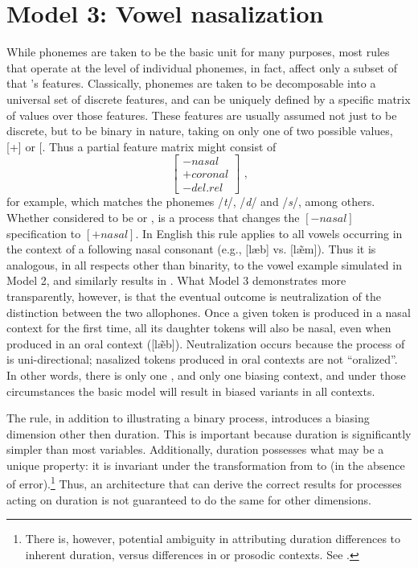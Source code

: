 \section{\label{subsec:Model-3:-Nasalization}Model 3: Vowel nasalization}

While phonemes are taken to be the basic  unit for many
purposes, most  rules that operate at the level of individual
phonemes, in fact, affect only a subset of that 's features.
Classically, phonemes are taken to be decomposable into a universal
set of discrete features, and can be uniquely defined by a specific
matrix of values over those features. These features are usually assumed
not just to be discrete, but to be binary in nature, taking on only
one of two possible values, {[}+{]} or {[}\textminus{]}. Thus a partial
feature matrix might consist of 
\[\left[\begin{array}{c}
-\textit{nasal}\\
+\textit{coronal}\\
-\textit{del.rel}
\end{array}\right]\text{ ,}\]
for example, which matches the phonemes /\emph{t}/, /\emph{d}/\emph{
}and /\emph{s}/, among others. Whether considered to be  or
,  is a process that changes the $\left[-\textit{nasal}\right]$
specification to $\left[+\textit{nasal}\right]$. In English this rule applies
to all vowels occurring in the context of a following nasal consonant
(e.g., {[læb]} vs. {[læ̃m]}). Thus it is analogous,
in all respects other than binarity, to the vowel  example
simulated in Model 2, and similarly results in . What
Model 3 demonstrates more transparently, however, is that the eventual
outcome is neutralization of the distinction between the two allophones.
Once a given token is produced in a nasal context for the first time,
all its daughter tokens will also be nasal, even when produced in
an oral context ({[læ̃b]}). Neutralization occurs because
the process of  is uni-directional; nasalized tokens produced
in oral contexts are not ``oralized''. In other words, there is only
one , and only one biasing context, and under those circumstances
the basic  model will result in biased variants in all contexts.

The  rule, in addition to illustrating a binary process,
introduces a biasing dimension other then duration. This is important
because duration is significantly simpler than most  variables.
Additionally, duration possesses what may be a unique property: it
is invariant under the transformation from  to 
(in the absence of error).\footnote{There is, however, potential ambiguity in attributing duration differences
to inherent duration, versus differences in  or prosodic
contexts. See . } Thus, an architecture that can derive the correct results for 
processes acting on duration is not guaranteed to do the same for
other  dimensions. 

